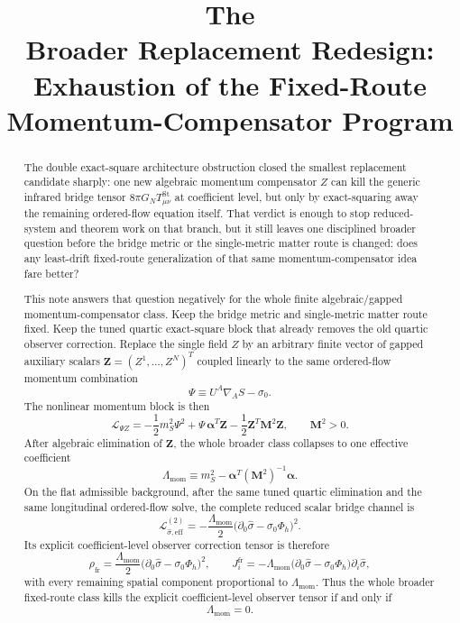\documentclass[11pt]{article}
\title{\textbf{The \TheoryName{}}\\[0.4em]
\large Broader Replacement Redesign: Exhaustion of the Fixed-Route Momentum-Compensator Program}
\author{}
\date{}
\begin{document}
\maketitle

\begin{abstract}
The double exact-square architecture obstruction closed the smallest replacement candidate sharply: one new algebraic momentum compensator \(Z\) can kill the generic infrared bridge tensor \(8\pi G_NT_{\mu\nu}^{\mathrm{St}}\) at coefficient level, but only by exact-squaring away the remaining ordered-flow equation itself. That verdict is enough to stop reduced-system and theorem work on that branch, but it still leaves one disciplined broader question before the bridge metric or the single-metric matter route is changed: does any least-drift fixed-route generalization of that same momentum-compensator idea fare better?

This note answers that question negatively for the whole finite algebraic/gapped momentum-compensator class. Keep the bridge metric and single-metric matter route fixed. Keep the tuned quartic exact-square block that already removes the old quartic observer correction. Replace the single field \(Z\) by an arbitrary finite vector of gapped auxiliary scalars \(\bm Z=(Z^1,\dots,Z^N)^T\) coupled linearly to the same ordered-flow momentum combination
\[
\Psi\equiv U^A\nabla_A S-\sigma_0.
\]
The nonlinear momentum block is then
\[
\mathcal L_{\Psi Z}
=
-\frac12 m_S^2\Psi^2
+\Psi\,\bm\alpha^T\bm Z
-\frac12 \bm Z^T\mathbf M^2\bm Z,
\qquad
\mathbf M^2>0.
\]
After algebraic elimination of \(\bm Z\), the whole broader class collapses to one effective coefficient
\[
\Lambda_{\mathrm{mom}}
\equiv
m_S^2-\bm\alpha^T(\mathbf M^2)^{-1}\bm\alpha.
\]
On the flat admissible background, after the same tuned quartic elimination and the same longitudinal ordered-flow solve, the complete reduced scalar bridge channel is
\[
\mathcal L_{\hat\sigma,\mathrm{eff}}^{(2)}
=
-\frac{\Lambda_{\mathrm{mom}}}{2}
\bigl(\partial_0\hat\sigma-\sigma_0\Phi_h\bigr)^2.
\]
Its explicit coefficient-level observer correction tensor is therefore
\[
\rho_{\mathrm{fr}}
=
\frac{\Lambda_{\mathrm{mom}}}{2}
\bigl(\partial_0\hat\sigma-\sigma_0\Phi_h\bigr)^2,
\qquad
J_i^{\mathrm{fr}}
=
-\Lambda_{\mathrm{mom}}
\bigl(\partial_0\hat\sigma-\sigma_0\Phi_h\bigr)\partial_i\hat\sigma,
\]
with every remaining spatial component proportional to \(\Lambda_{\mathrm{mom}}\). Thus the whole broader fixed-route class kills the explicit coefficient-level observer tensor if and only if
\[
\Lambda_{\mathrm{mom}}=0.
\]


\end{abstract}
\end{document}
